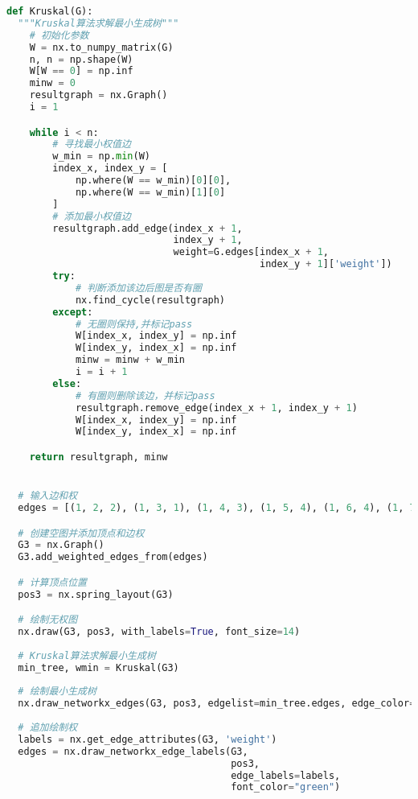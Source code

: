 \documentclass[withoutpreface]{cumcmthesis}
\begin{document}
  \begin{lstlisting}[language=python ,caption={Kruskal算法} ]
  def Kruskal(G):
  """Kruskal算法求解最小生成树"""
    # 初始化参数
    W = nx.to_numpy_matrix(G)
    n, n = np.shape(W)
    W[W == 0] = np.inf
    minw = 0
    resultgraph = nx.Graph()
    i = 1

    while i < n:
        # 寻找最小权值边
        w_min = np.min(W)
        index_x, index_y = [
            np.where(W == w_min)[0][0],
            np.where(W == w_min)[1][0]
        ]
        # 添加最小权值边
        resultgraph.add_edge(index_x + 1,
                             index_y + 1,
                             weight=G.edges[index_x + 1,
                                            index_y + 1]['weight'])
        try:
            # 判断添加该边后图是否有圈
            nx.find_cycle(resultgraph)
        except:
            # 无圈则保持,并标记pass
            W[index_x, index_y] = np.inf
            W[index_y, index_x] = np.inf
            minw = minw + w_min
            i = i + 1
        else:
            # 有圈则删除该边，并标记pass
            resultgraph.remove_edge(index_x + 1, index_y + 1)
            W[index_x, index_y] = np.inf
            W[index_y, index_x] = np.inf

    return resultgraph, minw


  # 输入边和权
  edges = [(1, 2, 2), (1, 3, 1), (1, 4, 3), (1, 5, 4), (1, 6, 4), (1, 7, 2), (1, 8, 5), (1, 9, 4),(2, 3, 4), (2, 9, 1), (3, 4, 1), (4, 5, 1), (5, 6, 5), (6, 7, 2), (7, 8, 3), (8, 9, 5)]

  # 创建空图并添加顶点和边权
  G3 = nx.Graph()
  G3.add_weighted_edges_from(edges)

  # 计算顶点位置
  pos3 = nx.spring_layout(G3)

  # 绘制无权图
  nx.draw(G3, pos3, with_labels=True, font_size=14)
  
  # Kruskal算法求解最小生成树
  min_tree, wmin = Kruskal(G3)
  
  # 绘制最小生成树
  nx.draw_networkx_edges(G3, pos3, edgelist=min_tree.edges, edge_color="red", width=3)
  
  # 追加绘制权
  labels = nx.get_edge_attributes(G3, 'weight')
  edges = nx.draw_networkx_edge_labels(G3,
                                       pos3,
                                       edge_labels=labels,
                                       font_color="green")
  \end{lstlisting}
\end{document}
